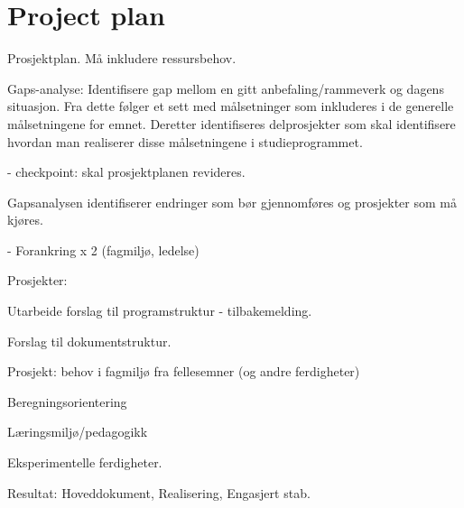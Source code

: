 \section{Project plan}

Prosjektplan. Må inkludere ressursbehov.

Gaps-analyse: Identifisere gap mellom en gitt anbefaling/rammeverk og dagens situasjon. Fra dette følger et sett med målsetninger som inkluderes i de generelle målsetningene for emnet. Deretter identifiseres delprosjekter som skal identifisere hvordan man realiserer disse målsetningene i studieprogrammet.

- checkpoint: skal prosjektplanen revideres.

Gapsanalysen identifiserer endringer som bør gjennomføres og prosjekter som må kjøres.

- Forankring x 2 (fagmiljø, ledelse)

Prosjekter:

Utarbeide forslag til programstruktur - tilbakemelding.

Forslag til dokumentstruktur.

Prosjekt: behov i fagmiljø fra fellesemner (og andre ferdigheter)

Beregningsorientering

Læringsmiljø/pedagogikk

Eksperimentelle ferdigheter.

Resultat: Hoveddokument, Realisering, Engasjert stab.

